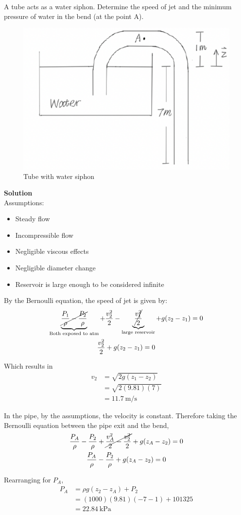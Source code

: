 \section{}
A tube acts as a water siphon. Determine the speed of jet and the
minimum pressure of water in the bend (at the point A).

\begin{figure}[h]
    \centering
    \includegraphics[width=0.5\linewidth]{Questions/Figures/Q1ProblemDiagram.png}
    \caption{Tube with water siphon}
    \label{fig:Q1ProblemDiagram}
\end{figure}

\textbf{Solution} \\
Assumptions:
\begin{itemize}
    \item Steady flow
    \item Incompressible flow
    \item Negligible viscous effects
    \item Negligible diameter change
    \item Reservoir is large enough to be considered infinite
\end{itemize}

By the Bernoulli equation, the speed of jet is given by:
\begin{gather*}
    \underbrace{\cancel{\frac{P_1}{\rho} - \frac{P_2}{\rho}}}_{\text{Both exposed to atm}} + \frac{v_2^2}{2} - \underbrace{\cancel{\frac{v_1^2}{2}}}_{\text{large reservoir}} + g(z_2 - z_1) = 0 \\
    \frac{v_2^2}{2} + g(z_2 - z_1) = 0 
\end{gather*}

Which results in
\begin{align*}
    v_2 &= \sqrt{2g(z_1 - z_2)} \\
    &= \sqrt{2(9.81)(7)} \\
    &= \boxed{\qty{11.7}{\meter\per\second}}
\end{align*}

In the pipe, by the assumptions, the velocity is constant. Therefore taking the Bernoulli equation between the pipe exit and the bend, 
\begin{gather*}
    \frac{P_A}{\rho} - \frac{P_2}{\rho} + \cancel{\frac{v_A^2}{2} - \frac{v_2^2}{2}} + g(z_A - z_2) = 0 \\
    \frac{P_A}{\rho} - \frac{P_2}{\rho} + g(z_A - z_2) = 0 \\
\end{gather*}

Rearranging for $P_A$,
\begin{align*}
    P_A &= \rho g(z_2 - z_A) + P_2 \\
    &= (1000)(9.81)(-7 - 1) + 101325 \\
    &= \boxed{\qty{22.84}{\kilo\pascal}}
\end{align*}